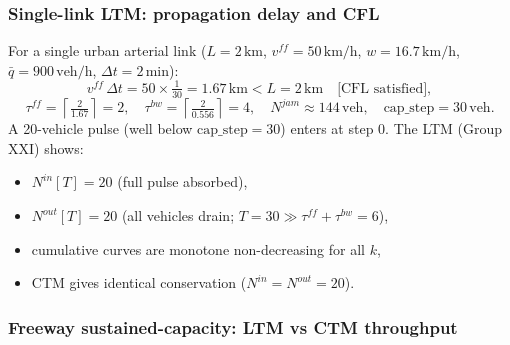 \subsubsection{Single-link LTM: propagation delay and CFL}
\label{sec:traffic-nr-single-link}

For a single urban arterial link ($L = 2\,\text{km}$, $v^{ff} = 50\,\text{km/h}$,
$w = 16.7\,\text{km/h}$, $\bar{q} = 900\,\text{veh/h}$, $\Delta t = 2\,\text{min}$):
\begin{equation*}
  v^{ff}\,\Delta t = 50 \times \tfrac{1}{30} = 1.67\,\text{km} < L = 2\,\text{km}
  \quad\text{[CFL satisfied]},
\end{equation*}
\begin{equation*}
  \tau^{ff} = \left\lceil\tfrac{2}{1.67}\right\rceil = 2, \quad
  \tau^{bw} = \left\lceil\tfrac{2}{0.556}\right\rceil = 4, \quad
  N^{jam} \approx 144\,\text{veh}, \quad
  \text{cap\_step} = 30\,\text{veh}.
\end{equation*}
A 20-vehicle pulse (well below $\text{cap\_step} = 30$) enters at step 0.
The LTM (Group XXI) shows:
\begin{itemize}
  \item $N^{in}[T] = 20$ (full pulse absorbed),
  \item $N^{out}[T] = 20$ (all vehicles drain; $T = 30 \gg \tau^{ff}+\tau^{bw}=6$),
  \item cumulative curves are monotone non-decreasing for all $k$,
  \item CTM gives identical conservation ($N^{in} = N^{out} = 20$).
\end{itemize}

\subsubsection{Freeway sustained-capacity: LTM vs CTM throughput}

